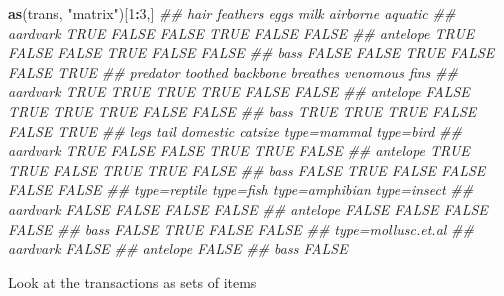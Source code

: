 \documentclass[
  notitlepage]{book}
\newenvironment{Shaded}{\begin{snugshade}}{\end{snugshade}}
\newcommand{\CommentTok}[1]{\textcolor[rgb]{0.56,0.35,0.01}{\textit{#1}}}
\newcommand{\DecValTok}[1]{\textcolor[rgb]{0.00,0.00,0.81}{#1}}
\newcommand{\KeywordTok}[1]{\textcolor[rgb]{0.13,0.29,0.53}{\textbf{#1}}}
\newcommand{\NormalTok}[1]{#1}
\newcommand{\OperatorTok}[1]{\textcolor[rgb]{0.81,0.36,0.00}{\textbf{#1}}}
\newcommand{\StringTok}[1]{\textcolor[rgb]{0.31,0.60,0.02}{#1}}
\begin{document}
\begin{Shaded}
\begin{Highlighting}[]
\KeywordTok{as}\NormalTok{(trans, }\StringTok{"matrix"}\NormalTok{)[}\DecValTok{1}\OperatorTok{:}\DecValTok{3}\NormalTok{,]}
\CommentTok{\#\#           hair feathers  eggs  milk airborne aquatic}
\CommentTok{\#\# aardvark  TRUE    FALSE FALSE  TRUE    FALSE   FALSE}
\CommentTok{\#\# antelope  TRUE    FALSE FALSE  TRUE    FALSE   FALSE}
\CommentTok{\#\# bass     FALSE    FALSE  TRUE FALSE    FALSE    TRUE}
\CommentTok{\#\#          predator toothed backbone breathes venomous  fins}
\CommentTok{\#\# aardvark     TRUE    TRUE     TRUE     TRUE    FALSE FALSE}
\CommentTok{\#\# antelope    FALSE    TRUE     TRUE     TRUE    FALSE FALSE}
\CommentTok{\#\# bass         TRUE    TRUE     TRUE    FALSE    FALSE  TRUE}
\CommentTok{\#\#           legs  tail domestic catsize type=mammal type=bird}
\CommentTok{\#\# aardvark  TRUE FALSE    FALSE    TRUE        TRUE     FALSE}
\CommentTok{\#\# antelope  TRUE  TRUE    FALSE    TRUE        TRUE     FALSE}
\CommentTok{\#\# bass     FALSE  TRUE    FALSE   FALSE       FALSE     FALSE}
\CommentTok{\#\#          type=reptile type=fish type=amphibian type=insect}
\CommentTok{\#\# aardvark        FALSE     FALSE          FALSE       FALSE}
\CommentTok{\#\# antelope        FALSE     FALSE          FALSE       FALSE}
\CommentTok{\#\# bass            FALSE      TRUE          FALSE       FALSE}
\CommentTok{\#\#          type=mollusc.et.al}
\CommentTok{\#\# aardvark              FALSE}
\CommentTok{\#\# antelope              FALSE}
\CommentTok{\#\# bass                  FALSE}
\end{Highlighting}
\end{Shaded}

Look at the transactions as sets of items
\end{document}
